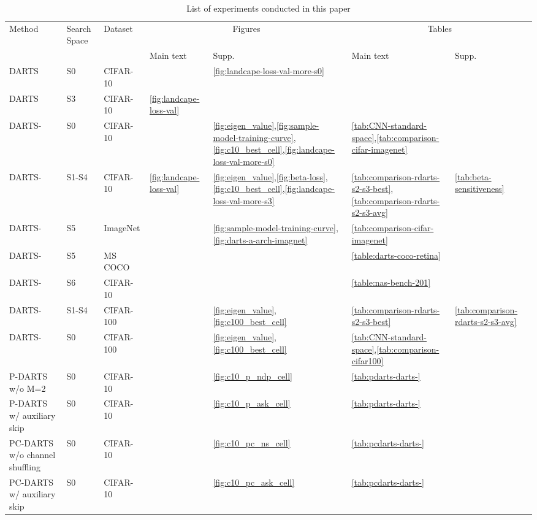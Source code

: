 \documentclass{article} \usepackage{iclr2021_conference,times}
\begin{document}
\begin{table*}[ht]
\centering
\caption{List of experiments conducted in this paper}\smallskip
\small
\begin{tabular}{*{7}{l}}
\toprule
Method & Search Space & Dataset &  \multicolumn{2}{c}{Figures}  &  \multicolumn{2}{c}{Tables} \\ 
& &  &  \scriptsize{Main text} &  \scriptsize{Supp.} & \scriptsize{Main text} &  \scriptsize{Supp.} \\
\midrule
DARTS & S0 & CIFAR-10 &  &\ref{fig:landcape-loss-val-more-s0} &  & \\
DARTS & S3 & CIFAR-10 & \ref{fig:landcape-loss-val} & &  & \\
DARTS- & S0 &  CIFAR-10 & & \ref{fig:eigen_value},\ref{fig:sample-model-training-curve},\ref{fig:c10_best_cell},\ref{fig:landcape-loss-val-more-s0}  &\ref{tab:CNN-standard-space},\ref{tab:comparison-cifar-imagenet} & \\
DARTS- & S1-S4 &  CIFAR-10 &  \ref{fig:landcape-loss-val} &\ref{fig:eigen_value},\ref{fig:beta-loss},\ref{fig:c10_best_cell},\ref{fig:landcape-loss-val-more-s3} & \ref{tab:comparison-rdarts-s2-s3-best},\ref{tab:comparison-rdarts-s2-s3-avg} & \ref{tab:beta-sensitiveness} \\
DARTS- & S5 &  ImageNet & & \ref{fig:sample-model-training-curve},\ref{fig:darts-a-arch-imagnet} & \ref{tab:comparison-cifar-imagenet} &\\ 
DARTS- & S5 &  MS COCO & & & \ref{table:darts-coco-retina} &\\
DARTS- & S6 & CIFAR-10 & &  & \ref{table:nas-bench-201} & \\
DARTS- & S1-S4 &  CIFAR-100 & & \ref{fig:eigen_value},\ref{fig:c100_best_cell}   &\ref{tab:comparison-rdarts-s2-s3-best} &  \ref{tab:comparison-rdarts-s2-s3-avg} \\
DARTS- & S0 &  CIFAR-100 & &\ref{fig:eigen_value},\ref{fig:c100_best_cell} & \ref{tab:CNN-standard-space},\ref{tab:comparison-cifar100} &\\
P-DARTS w/o M=2      & S0  & CIFAR-10 & & \ref{fig:c10_p_ndp_cell} & \ref{tab:pdarts-darts-}  &\\ 
P-DARTS w/ auxiliary skip & S0  &CIFAR-10 &  &\ref{fig:c10_p_ask_cell}  & \ref{tab:pdarts-darts-} &\\
PC-DARTS w/o channel shuffling & S0 &CIFAR-10 & & \ref{fig:c10_pc_ns_cell}   & \ref{tab:pcdarts-darts-}  &\\
PC-DARTS w/ auxiliary skip & S0  & CIFAR-10 &  &\ref{fig:c10_pc_ask_cell}   &  \ref{tab:pcdarts-darts-} & \\
\bottomrule
\end{tabular}
\label{tab:list-exp}
\end{table*}
\end{document}
